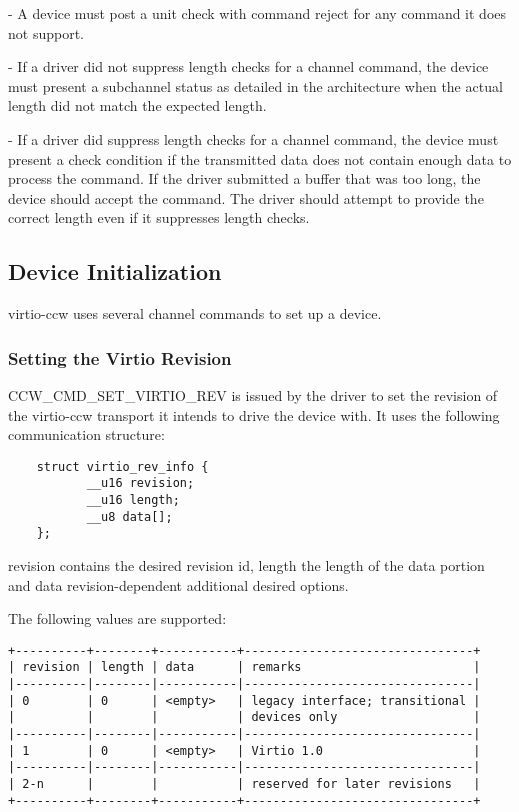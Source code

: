 - A device must post a unit check with command reject for any command
  it does not support.

- If a driver did not suppress length checks for a channel command,
  the device must present a subchannel status as detailed in the
  architecture when the actual length did not match the expected length.

- If a driver did suppress length checks for a channel command, the
  device must present a check condition if the transmitted data does
  not contain enough data to process the command. If the driver submitted
  a buffer that was too long, the device should accept the command.
  The driver should attempt to provide the correct length even if it
  suppresses length checks.

\subsection{Device Initialization}\label{sec:Virtio Transport Options / Virtio over channel I/O / Device Initialization}

virtio-ccw uses several channel commands to set up a device.

\subsubsection{Setting the Virtio Revision}\label{sec:Virtio Transport Options / Virtio over channel I/O / Device Initialization / Setting the Virtio Revision}

CCW_CMD_SET_VIRTIO_REV is issued by the driver to set the revision of
the virtio-ccw transport it intends to drive the device with. It uses the
following communication structure:

\begin{lstlisting}
	struct virtio_rev_info {
	       __u16 revision;
	       __u16 length;
	       __u8 data[];
	};
\end{lstlisting}

revision contains the desired revision id, length the length of the
data portion and data revision-dependent additional desired options.

The following values are supported:

\begin{verbatim}
+----------+--------+-----------+--------------------------------+
| revision | length | data      | remarks                        |
|----------|--------|-----------|--------------------------------|
| 0        | 0      | <empty>   | legacy interface; transitional |
|          |        |           | devices only                   |
|----------|--------|-----------|--------------------------------|
| 1        | 0      | <empty>   | Virtio 1.0                     |
|----------|--------|-----------|--------------------------------|
| 2-n      |        |           | reserved for later revisions   |
+----------+--------+-----------+--------------------------------+
\end{verbatim}

